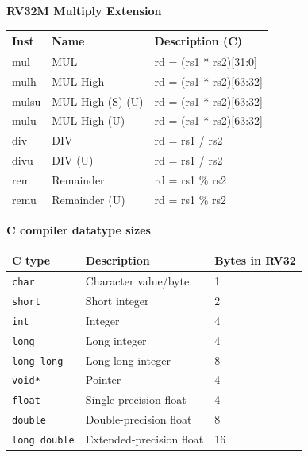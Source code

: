 \begin{multicols}{2}
    
    \textbf{RV32M Multiply Extension}\\
    \begin{tabular}
        {|l | l | l|} \hline
        \rm Inst & Name              & \rm Description (C)     \\ \hline
        mul      & MUL               & rd = (rs1 * rs2)[31:0]  \\
        mulh     & MUL High          & rd = (rs1 * rs2)[63:32] \\
        mulsu    & MUL High (S) (U)  & rd = (rs1 * rs2)[63:32] \\
        mulu     & MUL High (U)      & rd = (rs1 * rs2)[63:32] \\
        div      & DIV               & rd = rs1 / rs2          \\
        divu     & DIV (U)           & rd = rs1 / rs2          \\
        rem      & Remainder         & rd = rs1 \% rs2         \\
        remu     & Remainder (U)     & rd = rs1 \% rs2         \\
        \hline
    \end{tabular}

    \columnbreak

    \textbf{C compiler datatype sizes}\\
    \begin{tabular} {|l | l | l |} \hline
        C type              &  Description             & Bytes in RV32      \\ \hline
        \texttt{char}       & Character value/byte     & 1                  \\
        \texttt{short}      & Short integer            & 2                  \\
        \texttt{int}        & Integer                  & 4                  \\
        \texttt{long}       & Long integer             & 4                  \\
        \texttt{long long}  & Long long integer        & 8                  \\
        \texttt{void*}      & Pointer                  & 4                  \\
        \texttt{float}      & Single-precision float   & 4                  \\
        \texttt{double}     & Double-precision float   & 8                  \\
        \texttt{long double}& Extended-precision float & 16                 \\\hline
    \end{tabular}
\end{multicols}